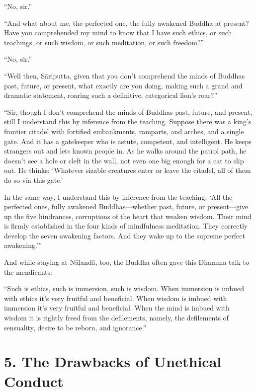 \documentclass[12pt,openany]{book}%
\begin{document}
“No, sir.” 

“And what about me, the perfected one, the fully awakened Buddha at present? Have you comprehended my mind to know that I have such ethics, or such teachings, or such wisdom, or such meditation, or such freedom?” 

“No, sir.” 

“Well then, \textsanskrit{Sāriputta}, given that you don’t comprehend the minds of Buddhas past, future, or present, what exactly are you doing, making such a grand and dramatic statement, roaring such a definitive, categorical lion’s roar?” 

“Sir, though I don’t comprehend the minds of Buddhas past, future, and present, still I understand this by inference from the teaching. Suppose there was a king’s frontier citadel with fortified embankments, ramparts, and arches, and a single gate. And it has a gatekeeper who is astute, competent, and intelligent. He keeps strangers out and lets known people in. As he walks around the patrol path, he doesn’t see a hole or cleft in the wall, not even one big enough for a cat to slip out. He thinks: ‘Whatever sizable creatures enter or leave the citadel, all of them do so via this gate.’ 

In the same way, I understand this by inference from the teaching: ‘All the perfected ones, fully awakened Buddhas—whether past, future, or present—give up the five hindrances, corruptions of the heart that weaken wisdom. Their mind is firmly established in the four kinds of mindfulness meditation. They correctly develop the seven awakening factors. And they wake up to the supreme perfect awakening.’” 

And while staying at \textsanskrit{Nāḷandā}, too, the Buddha often gave this Dhamma talk to the mendicants: 

“Such is ethics, such is immersion, such is wisdom. When immersion is imbued with ethics it’s very fruitful and beneficial. When wisdom is imbued with immersion it’s very fruitful and beneficial. When the mind is imbued with wisdom it is rightly freed from the defilements, namely, the defilements of sensuality, desire to be reborn, and ignorance.” 

\section*{5. The Drawbacks of Unethical Conduct }
\end{document}
